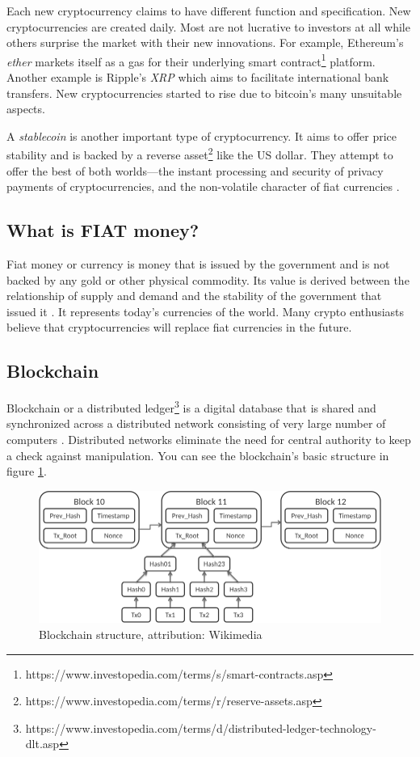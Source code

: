 Each new cryptocurrency claims to have different function and specification. New cryptocurrencies are created daily. Most are not lucrative to investors at all while others surprise the market with their new innovations. For example, Ethereum's \emph{ether} markets itself as a gas for their underlying smart contract\footnote{https://www.investopedia.com/terms/s/smart-contracts.asp} platform. Another example is Ripple's \emph{XRP} which aims to facilitate international bank transfers. New cryptocurrencies started to rise due to bitcoin's many unsuitable aspects.

\label{stablecoins-ref}
A \emph{stablecoin} is another important type of cryptocurrency. It aims to offer price stability and is backed by a reverse asset\footnote{https://www.investopedia.com/terms/r/reserve-assets.asp} like the US dollar. They attempt to offer the best of both worlds---the instant processing and security of privacy payments of cryptocurrencies, and the non-volatile character of fiat currencies \cite{investopedia-stablecoin}.

\subsection*{What is FIAT money?}
﻿Fiat money or currency is money that is issued by the government and is not backed by any gold or other physical commodity. Its value is derived between the relationship of supply and demand and the stability of the government that issued it \cite{investopedia-fiat}. It represents today's currencies of the world. Many crypto enthusiasts believe that cryptocurrencies will replace fiat currencies in the future.

\subsection*{Blockchain}
\label{blockchain}
Blockchain or a distributed ledger\footnote{https://www.investopedia.com/terms/d/distributed-ledger-technology-dlt.asp} is a digital database that is shared and synchronized across a distributed network consisting of very large number of computers \cite{investopedia-blockchain}. Distributed networks eliminate the need for central authority to keep a check against manipulation. You can see the blockchain's basic structure in figure \ref{blockchain-figure}.

\begin{figure}[h!]
    \label{blockchain-figure}
    \centering
    \includegraphics[width=\columnwidth]{figures/Bitcoin_Block_Data.png}
    \caption{Blockchain structure, attribution: Wikimedia}
\end{figure}

